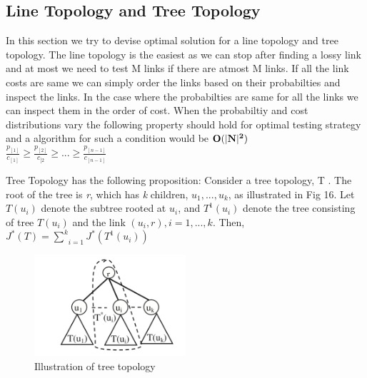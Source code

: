 \documentclass[10pt]{sigplan-proc-varsize}
\begin{document}
\subsection{Line Topology and Tree Topology}
In this section we try to devise optimal solution for a line topology and tree topology. The line topology is the easiest as we can stop after finding a lossy link and at most we need to test M links if there are atmost M links. If all the link costs are same we can simply order the links  based on their probabilties and inspect the links. In the case where the probabilties are same for all the links we can inspect them in the order of cost. When the probabiltiy and cost distributions vary the following property should hold for optimal testing strategy and a algorithm for such a condition would be ${\bf O(|N|^2)}$\\
$\frac{p_{[1]}}{c_{[1]}} \geq \frac{p_{[2]}}{c_{[2}} \geq ... \geq \frac{p_{[n-1]}}{c_{[n-1]}}$

Tree Topology has the following proposition: Consider a tree topology, T . The root of the tree is {\it r}, which has {\it k} children, $u_1, . . . ,u_k$, as illustrated in Fig 16. Let $T(u_i)$ denote the subtree rooted at $u_i$, and $T^1(u_i)$ denote the tree consisting of tree $T(u_i)$ and the link $(u_i,r), i=1,...,k$. Then, \\
$J^*(T)=\underset{i=1}{\overset{k}{\sum}}J^*(T^1(u_i))$

\begin{figure}[h!]
  \caption{Illustration of tree topology}
  \centering
    \includegraphics[width=0.5\textwidth]{Fig18}
\end{figure}

\appendix
%
%


\end{document}
